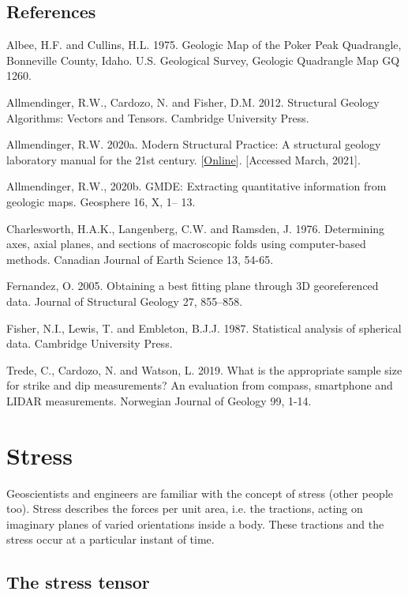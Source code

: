 \documentclass[a4paper , 12pt]{book}
\begin{document}
\section*{References}

Albee, H.F. and Cullins, H.L. 1975. Geologic Map of the Poker Peak Quadrangle, Bonneville County, Idaho. U.S. Geological Survey, Geologic Quadrangle Map GQ 1260.

Allmendinger, R.W., Cardozo, N. and Fisher, D.M. 2012. Structural Geology Algorithms: Vectors and Tensors. Cambridge University Press.

Allmendinger, R.W. 2020a. Modern Structural Practice: A structural geology laboratory manual for the 21st century. [\href{https://www.rickallmendinger.net/download}{Online}]. [Accessed March, 2021].

Allmendinger, R.W., 2020b. GMDE: Extracting quantitative information from geologic maps. Geosphere 16, X, 1– 13.

Charlesworth, H.A.K., Langenberg, C.W. and Ramsden, J. 1976. Determining axes, axial planes, and sections of macroscopic folds using computer-based methods. Canadian Journal of Earth Science 13, 54-65.

Fernandez, O. 2005. Obtaining a best fitting plane through 3D georeferenced data. Journal of Structural Geology 27, 855–858.

Fisher, N.I., Lewis, T. and Embleton, B.J.J. 1987. Statistical analysis of spherical data. Cambridge University Press.

Trede, C., Cardozo, N. and Watson, L. 2019. What is the appropriate sample size for strike and dip measurements? An evaluation from compass, smartphone and LIDAR measurements. Norwegian Journal of Geology 99, 1-14.

\chapter{Stress}

Geoscientists and engineers are familiar with the concept of stress (other people too). Stress describes the forces per unit area, i.e. the tractions, acting on imaginary planes of varied orientations inside a body. These tractions and the stress occur at a particular instant of time. 

\section{The stress tensor}
\end{document}
